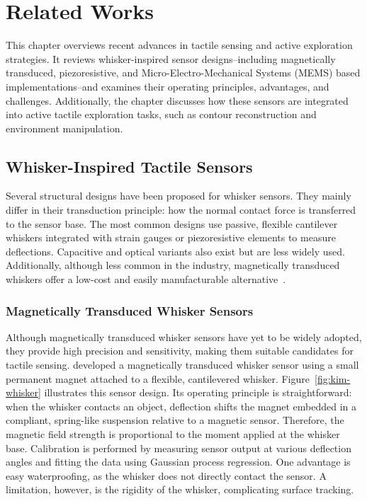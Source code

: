

\chapter{Related Works}

This chapter overviews recent advances in tactile sensing and active exploration strategies.
It reviews whisker-inspired sensor designs--including magnetically transduced, piezoresistive, and Micro-Electro-Mechanical Systems (MEMS) based implementations--and examines their operating principles, advantages, and challenges.
Additionally, the chapter discusses how these sensors are integrated into active tactile exploration tasks, such as contour reconstruction and environment manipulation.


\section{Whisker-Inspired Tactile Sensors}
Several structural designs have been proposed for whisker sensors.
They mainly differ in their transduction principle: how the normal contact force is transferred to the sensor base.
The most common designs use passive, flexible cantilever whiskers integrated with strain gauges or piezoresistive elements to measure deflections.
Capacitive and optical variants also exist but are less widely used.
Additionally, although less common in the industry, magnetically transduced whiskers offer a low-cost and easily manufacturable alternative~\cite{8968518}.

\subsection{Magnetically Transduced Whisker Sensors}
Although magnetically transduced whisker sensors have yet to be widely adopted, they provide high precision and sensitivity, making them suitable candidates for tactile sensing.
\textcite{8968518} developed a magnetically transduced whisker sensor using a small permanent magnet attached to a flexible, cantilevered whisker.
Figure~\ref{fig:kim-whisker} illustrates this sensor design.
Its operating principle is straightforward: when the whisker contacts an object, deflection shifts the magnet embedded in a compliant, spring-like suspension relative to a magnetic sensor.
Therefore, the magnetic field strength is proportional to the moment applied at the whisker base.
Calibration is performed by measuring sensor output at various deflection angles and fitting the data using Gaussian process regression.
One advantage is easy waterproofing, as the whisker does not directly contact the sensor.
A limitation, however, is the rigidity of the whisker, complicating surface tracking.

